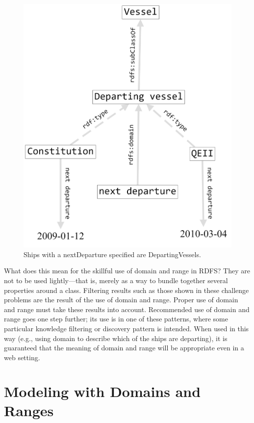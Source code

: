 \begin{figure}
\centering
\includegraphics[width=5in]{SWWOv3/media/ch8/figure8-5.png}
\caption{\label{fig:ch8.5}Ships with a nextDeparture specified are DepartingVessels.}
\end{figure}





What does this mean for the skillful use of domain and range in RDFS?
They are not to be used lightly---that is, merely as a way to bundle
together several properties around a class. Filtering results such as
those shown in these challenge problems are the result of the use of
domain and range. Proper use of domain and range must take these results
into account. Recommended use of domain and range goes one step further;
its use is in one of these patterns, where some particular knowledge
filtering or discovery pattern is intended. When used in this way (e.g.,
using domain to describe which of the ships are departing), it is
guaranteed that the meaning of domain and range will be appropriate even
in a web setting.

\section{Modeling with Domains and Ranges}

